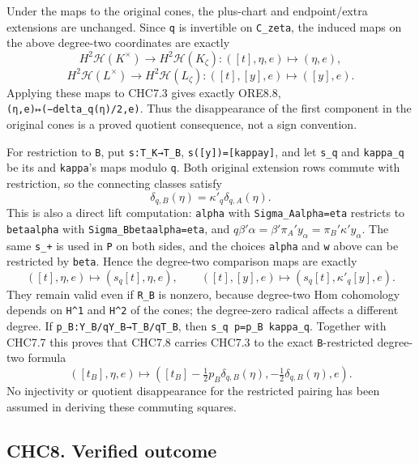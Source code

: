 Under the maps to the original cones, the plus-chart and endpoint/extra
extensions are unchanged. Since \texttt{q} is invertible on
\texttt{C\_zeta}, the induced maps on the above degree-two coordinates
are exactly \[
H^2\mathscr H(K^\times)\to H^2\mathscr H(K_\zeta):
([t],\eta,e)\longmapsto(\eta,e),
\] \[
H^2\mathscr H(L^\times)\to H^2\mathscr H(L_\zeta):
([t],[y],e)\longmapsto([y],e).
\tag{CHC7.6}
\] Applying these maps to CHC7.3 gives exactly ORE8.8,
\texttt{(η,e)↦(−delta\_q(η)/2,e)}. Thus the disappearance of the first
component in the original cones is a proved quotient consequence, not a
sign convention.

For restriction to \texttt{B}, put \texttt{s:T\_K→T\_B},
\texttt{s({[}y{]})={[}kappa\textquotesingle{}y{]}}, and let
\texttt{s\_q} and \texttt{kappa\textquotesingle{}\_q} be its and
\texttt{kappa\textquotesingle{}}'s maps modulo \texttt{q}. Both original
extension rows commute with restriction, so the connecting classes
satisfy \[
\delta_{q,B}(\eta)=\kappa'_q\delta_{q,A}(\eta).
\tag{CHC7.7}
\] This is also a direct lift computation: \texttt{alpha} with
\texttt{Sigma\_A\textquotesingle{}alpha=eta} restricts to
\texttt{beta\textquotesingle{}alpha} with
\texttt{Sigma\_B\textquotesingle{}beta\textquotesingle{}alpha=eta}, and
\(q\beta'\alpha=\beta'\pi_A'y_\alpha
=\pi_B'\kappa'y_\alpha\). The same \texttt{s\_+} is used in
\texttt{P\textquotesingle{}} on both sides, and the choices
\texttt{alpha} and \texttt{w} above can be restricted by
\texttt{beta\textquotesingle{}}. Hence the degree-two comparison maps
are exactly \[
([t],\eta,e)\longmapsto(s_q[t],\eta,e),
\qquad
([t],[y],e)\longmapsto(s_q[t],\kappa'_q[y],e).
\tag{CHC7.8}
\] They remain valid even if \texttt{R\_B} is nonzero, because
degree-two Hom cohomology depends on \texttt{H\^{}1} and \texttt{H\^{}2}
of the cones; the degree-zero radical affects a different degree. If
\texttt{p\_B:Y\_B/qY\_B→T\_B/qT\_B}, then
\texttt{s\_q\ p=p\_B\ kappa\textquotesingle{}\_q}. Together with CHC7.7
this proves that CHC7.8 carries CHC7.3 to the exact
\texttt{B}-restricted degree-two formula \[
([t_B],\eta,e)\longmapsto
\left([t_B]-\tfrac12p_B\delta_{q,B}(\eta),
-\tfrac12\delta_{q,B}(\eta),e\right).
\tag{CHC7.9}
\] No injectivity or quotient disappearance for the restricted pairing
has been assumed in deriving these commuting squares.

\subsection{CHC8. Verified outcome}\label{chc8.-verified-outcome}

